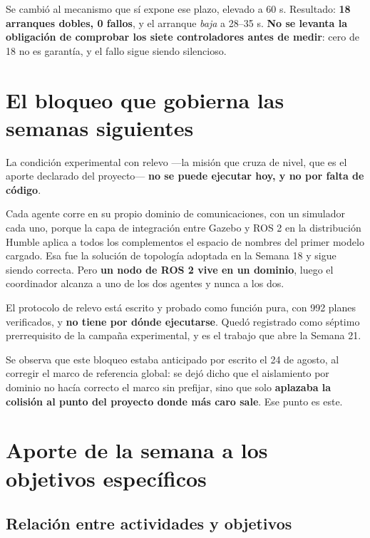 \documentclass[12pt,letterpaper]{article}
\begin{document}
Se cambió al mecanismo que sí expone ese plazo, elevado a 60 s. Resultado: \textbf{18 arranques dobles, 0 fallos}, y el arranque \emph{baja} a 28--35 s. \textbf{No se levanta la obligación de comprobar los siete controladores antes de medir}: cero de 18 no es garantía, y el fallo sigue siendo silencioso.

\section{El bloqueo que gobierna las semanas siguientes}
\label{sec:bloqueo}

La condición experimental con relevo ---la misión que cruza de nivel, que es el aporte declarado del proyecto--- \textbf{no se puede ejecutar hoy, y no por falta de código}.

Cada agente corre en su propio dominio de comunicaciones, con un simulador cada uno, porque la capa de integración entre Gazebo y ROS 2 en la distribución Humble aplica a todos los complementos el espacio de nombres del primer modelo cargado. Esa fue la solución de topología adoptada en la Semana 18 y sigue siendo correcta. Pero \textbf{un nodo de ROS 2 vive en un dominio}, luego el coordinador alcanza a uno de los dos agentes y nunca a los dos.

El protocolo de relevo está escrito y probado como función pura, con 992 planes verificados, y \textbf{no tiene por dónde ejecutarse}. Quedó registrado como séptimo prerrequisito de la campaña experimental, y es el trabajo que abre la Semana 21.

Se observa que este bloqueo estaba anticipado por escrito el 24 de agosto, al corregir el marco de referencia global: se dejó dicho que el aislamiento por dominio no hacía correcto el marco sin prefijar, sino que solo \textbf{aplazaba la colisión al punto del proyecto donde más caro sale}. Ese punto es este.

\section{Aporte de la semana a los objetivos específicos}
\label{sec:aporte}

\subsection{Relación entre actividades y objetivos}
\end{document}
